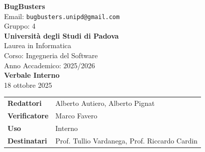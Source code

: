 \documentclass[a4paper,12pt]{article}
\begin{document}
\begin{center}  
  
  {\Large\bfseries\color{primaryblue} BugBusters}\\[0.3cm]
  {\small\color{darkgray} Email: \texttt{bugbusters.unipd@gmail.com}} \\[0.1cm]
  {\small\color{darkgray} Gruppo: 4} \\[0.5cm]

  {\large\bfseries Università degli Studi di Padova}\\[0.3cm]
  {\small Laurea in Informatica}\\[0.2cm]
  {\small Corso: Ingegneria del Software}\\[0.2cm]
  {\small Anno Accademico: 2025/2026}\\[0.8cm]

  {\Huge\bfseries\color{primaryblue} Verbale Interno}\\[0.3cm]
  {\Large\color{secondaryblue} 18 ottobre 2025}\\[0.8cm]
\end{center}

\begin{center}
\begin{tcolorbox}[colback=lightgray,colframe=primaryblue,width=0.85\textwidth,arc=3mm,boxrule=0.5pt]
\begin{tabular}{@{}ll@{}}
\textbf{Redattori}    & Alberto Autiero, Alberto Pignat \\
\textbf{Verificatore}    &  Marco Favero \\
\textbf{Uso}          & Interno \\
\textbf{Destinatari}  & Prof. Tullio Vardanega, Prof. Riccardo Cardin \\
\end{tabular}
\end{tcolorbox}
\end{center}
\end{document}
